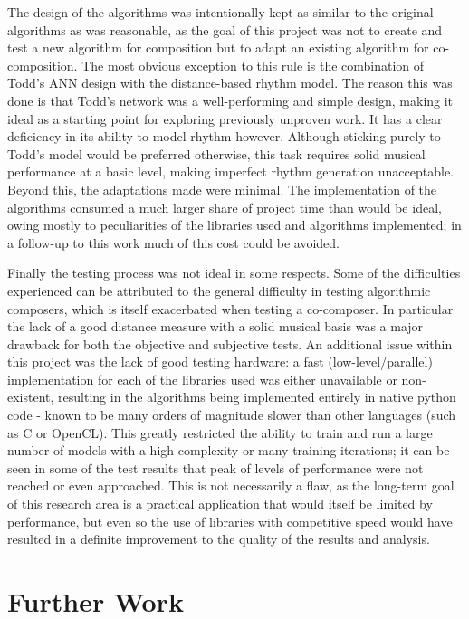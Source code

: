 \documentclass[ author={Stephen Livermore-Tozer},
				supervisor={Dr. Peter Flach},
				degree={MEng},
				title={Algorithmic Co-composition Using Machine Learning},
				subtitle={},
				type={research},
				year={2016} ]{dissertation}
\begin{document}
	The design of the algorithms was intentionally kept as similar to the original algorithms as was reasonable, as the goal of this project was not to create and test a new algorithm for composition but to adapt an existing algorithm for co-composition. The most obvious exception to this rule is the combination of Todd's ANN design with the distance-based rhythm model. The reason this was done is that Todd's network was a well-performing and simple design, making it ideal as a starting point for exploring previously unproven work. It has a clear deficiency in its ability to model rhythm however. Although sticking purely to Todd's model would be preferred otherwise, this task requires solid musical performance at a basic level, making imperfect rhythm generation unacceptable. Beyond this, the adaptations made were minimal. The implementation of the algorithms consumed a much larger share of project time than would be ideal, owing mostly to peculiarities of the libraries used and algorithms implemented; in a follow-up to this work much of this cost could be avoided.
	
	Finally the testing process was not ideal in some respects. Some of the difficulties experienced can be attributed to the general difficulty in testing algorithmic composers, which is itself exacerbated when testing a co-composer. In particular the lack of a good distance measure with a solid musical basis was a major drawback for both the objective and subjective tests. An additional issue within this project was the lack of good testing hardware: a fast (low-level/parallel) implementation for each of the libraries used was either unavailable or non-existent, resulting in the algorithms being implemented entirely in native python code - known to be many orders of magnitude slower than other languages (such as C or OpenCL). This greatly restricted the ability to train and run a large number of models with a high complexity or many training iterations; it can be seen in some of the test results that peak of levels of performance were not reached or even approached. This is not necessarily a flaw, as the long-term goal of this research area is a practical application that would itself be limited by performance, but even so the use of libraries with competitive speed would have resulted in a definite improvement to the quality of the results and analysis. 
	
	\section{Further Work}
	\label{sec:further-work}
	
\end{document}
